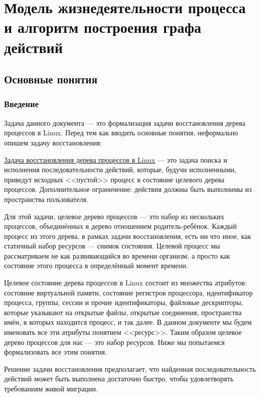 
\chapter{Модель жизнедеятельности процесса и алгоритм построения графа действий}

\section{Основные понятия}

\subsection{Введение}

Задача данного документа --- это формализация задачи восстановления дерева процессов в Linux. Перед тем как вводить основные понятия, неформально опишем задачу восстановления:

\underline{Задача восстановления дерева процессов в Linux} --- это задача поиска и исполнения последовательности действий, которые, будучи исполненными, приведут исходных <<пустой>> процесс в состояние целевого дерева процессов. Дополнительное ограничение: действия должны быть выполнимы из пространства пользователя.

Для этой задачи, целевое дерево процессов --- это набор из нескольких процессов, объединённых в дерево отношением родитель-ребёнок. Каждый процесс из этого дерева, в рамках задачи восстановления, есть ни что иное, как статичный набор ресурсов --- снимок состояния. Целевой процесс мы рассматриваем не как развивающийся во времени организм, а просто как состояние этого процесса в определённый момент времени.

Целевое состояние дерева процессов в Linux состоит из множества атрибутов: состояние виртуальной памяти, состояние регистров процессора, идентификатор процесса, группы, сессии и прочие идентификаторы, файловые дескрипторы, которые указывают на открытые файлы, открытые соединения, пространства имён, в которых находится процесс, и так далее. В данном документе мы будем именовать все эти атрибуты понятием <<ресурс>>. Таким образом целевое дерево процессов для нас --- это набор ресурсов. Ниже мы попытаемся формализовать все этим понятия.

Решение задачи восстановления предполагает, что найденная последовательность действий может быть выполнена достаточно быстро, чтобы удовлетворять требованиям живой миграции.

